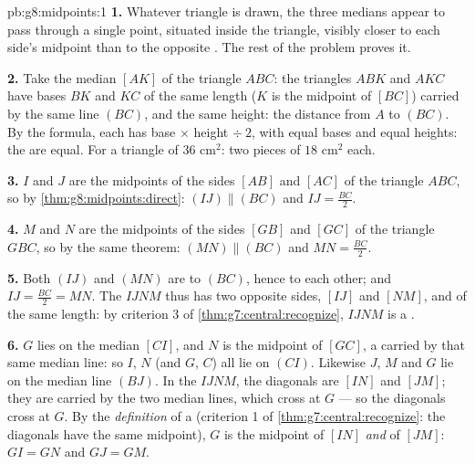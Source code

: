 \begin{solution}{pb:g8:midpoints:1}
\textbf{1.} Whatever triangle is drawn, the three medians appear
to pass through a single point, situated inside the triangle,
visibly closer to each side's midpoint than to the opposite
. The rest of the problem proves it.

\textbf{2.} Take the median $[AK]$ of the triangle $ABC$: the
triangles $ABK$ and $AKC$ have bases $BK$ and $KC$ of the same
length ($K$ is the midpoint of $[BC]$) carried by the same line
$(BC)$, and the same height: the distance from $A$ to $(BC)$.
By the  formula, each has 
base $\times$ height $\div\ 2$, with equal bases and equal
heights: the  are equal. For a triangle of 
$36$ cm$^2$: two pieces of $18$ cm$^2$ each.

\textbf{3.} $I$ and $J$ are the midpoints of the sides $[AB]$ and
$[AC]$ of the triangle $ABC$, so by
\cref{thm:g8:midpoints:direct}: $(IJ) \parallel (BC)$ and
$IJ = \frac{BC}{2}$.

\textbf{4.} $M$ and $N$ are the midpoints of the sides $[GB]$ and
$[GC]$ of the triangle $GBC$, so by the same theorem:
$(MN) \parallel (BC)$ and $MN = \frac{BC}{2}$.

\textbf{5.} Both $(IJ)$ and $(MN)$ are  to $(BC)$, hence
 to each other; and $IJ = \frac{BC}{2} = MN$. The
 $IJNM$ thus has two opposite sides, $[IJ]$ and
$[NM]$,  and of the same length: by criterion 3 of
\cref{thm:g7:central:recognize}, $IJNM$ is a .

\textbf{6.} $G$ lies on the median $[CI]$, and $N$ is the
midpoint of $[GC]$, a  carried by that same median line:
so $I$, $N$ (and $G$, $C$) all lie on $(CI)$. Likewise $J$, $M$
and $G$ lie on the median line $(BJ)$. In the 
$IJNM$, the diagonals are $[IN]$ and $[JM]$; they are carried by
the two median lines, which cross at $G$ --- so the diagonals
cross at $G$. By the \emph{definition} of a 
(criterion 1 of \cref{thm:g7:central:recognize}: the diagonals
have the same midpoint), $G$ is the midpoint of $[IN]$ \emph{and}
of $[JM]$: $GI = GN$ and $GJ = GM$.


\end{solution}
